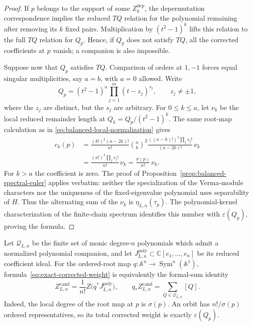 \documentclass[11pt]{article}
\theoremstyle{definition}
\newcommand{\A}{\mathbb A}
\newcommand{\C}{\mathbb C}
\newcommand{\Sym}{\operatorname{Sym}}
\begin{document}
\begin{proof}
If $p$ belongs to the support of some $Z_k^{\mathrm{dep}}$, the
depermutation correspondence implies the reduced $TQ$ relation for
the polynomial remaining after removing its $k$ fixed pairs.
Multiplication by $(t^2-1)^k$ lifts this relation to the full $TQ$
relation for $Q_p$. Hence, if $Q_p$ does not satisfy $TQ$, all the
corrected coefficients at $p$ vanish; a companion is also impossible.

Suppose now that $Q_p$ satisfies $TQ$. Comparison of orders at
$1,-1$ forces equal singular multiplicities, say $a=b$, with $a=0$
allowed. Write
\[
 Q_p=(t^2-1)^a\prod_{j=1}^m(t-z_j)^{s_j},\qquad
 z_j\ne\pm1,
\]
where the $z_j$ are distinct, but the $s_j$ are arbitrary.
For $0\le k\le a$, let $\nu_k$ be the local reduced remainder
length at $Q_k=Q_p/(t^2-1)^k$. The same root-map calculation as in
\eqref{eq:balanced-local-normalization} gives
\[
 \begin{aligned}
 c_k(p)
 &=\frac{(k!)^2(n-2k)!}{n!}\binom ak^2
   \frac{((a-k)!)^2\prod_j s_j!}{(n-2k)!}\,\nu_k\\
 &=\frac{(a!)^2\prod_j s_j!}{n!}\,\nu_k
  =\frac{\sigma(p)}{n!}\,\nu_k.
 \end{aligned}
\]
For $k>a$ the coefficient is zero. The proof of
Proposition~\ref{prop:balanced-spectral-euler} applies verbatim:
neither the specialization of the Verma-module characters nor the
uniqueness of the fixed-eigenvalue polynomial uses separability of
$H$. Thus the alternating sum of the $\nu_k$ is
$\eta_{L,n}(\tau_p)$. The polynomial-kernel characterization of the
finite-chain spectrum identifies this number with
$\varepsilon(Q_p)$, proving the formula.
\end{proof}

Let $\mathcal Q_{L,n}$ be the finite set of monic degree-$n$
polynomials which admit a normalized polynomial companion, and let
$J^{\mathrm{poly}}_{L,n}\subset\C[e_1,\ldots,e_n]$ be its reduced
coefficient ideal. For the ordered-root map
$q:\A^n\to\Sym^n(\A^1)$, formula~\eqref{eq:exact-corrected-weight}
is equivalently the formal-sum identity
\begin{equation}\label{eq:corrected-polynomial-kernel-ideal}
 Z^{\mathrm{cand}}_{L,n}
 =\frac1{n!}Z\bigl(q^*J^{\mathrm{poly}}_{L,n}\bigr),\qquad
 q_*Z^{\mathrm{cand}}_{L,n}=\sum_{Q\in\mathcal Q_{L,n}}[Q].
\end{equation}
Indeed, the local degree of the root map at $p$ is $\sigma(p)$.
An orbit has $n!/\sigma(p)$ ordered representatives, so its total
corrected weight is exactly $\varepsilon(Q_p)$.
\end{document}
